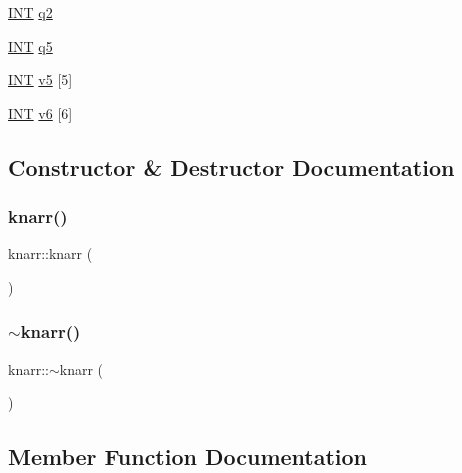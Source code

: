 \begin{DoxyCompactItemize}
\item 
\mbox{\hyperlink{galois_8h_a09fddde158a3a20bd2dcadb609de11dc}{I\+NT}} \mbox{\hyperlink{classknarr_a9dd0ae701d30185d73c0e80f7b16d07a}{q2}}
\item 
\mbox{\hyperlink{galois_8h_a09fddde158a3a20bd2dcadb609de11dc}{I\+NT}} \mbox{\hyperlink{classknarr_a7b53a993384dd61a8283bb38cec8d59e}{q5}}
\item 
\mbox{\hyperlink{galois_8h_a09fddde158a3a20bd2dcadb609de11dc}{I\+NT}} \mbox{\hyperlink{classknarr_a25c23ca6ab4ad793171b0a6f4b9e2d9b}{v5}} \mbox{[}5\mbox{]}
\item 
\mbox{\hyperlink{galois_8h_a09fddde158a3a20bd2dcadb609de11dc}{I\+NT}} \mbox{\hyperlink{classknarr_a6761776cd4c16cd7c38c03d502e21a34}{v6}} \mbox{[}6\mbox{]}
\end{DoxyCompactItemize}


\subsection{Constructor \& Destructor Documentation}
\mbox{\label{classknarr_a4f7f0096a6b462a94c0e18ba5be2dd3d}} 
\subsubsection{\texorpdfstring{knarr()}{knarr()}}
{\footnotesize\ttfamily knarr\+::knarr (\begin{DoxyParamCaption}{ }\end{DoxyParamCaption})}

\mbox{\label{classknarr_acebb53313c4bb70730d23783fba7c4ce}} 
\subsubsection{\texorpdfstring{$\sim$knarr()}{~knarr()}}
{\footnotesize\ttfamily knarr\+::$\sim$knarr (\begin{DoxyParamCaption}{ }\end{DoxyParamCaption})}



\subsection{Member Function Documentation}
\mbox{\label{classknarr_abd2281ac20def4284aa8431ba773e82c}} 
